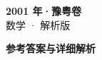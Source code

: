 \documentclass[zihao=-4, a4paper]{ctexart}
\begin{document}
\begin{center}
  {\Large\bfseries 2001 年·豫粤卷}\\[4pt]
  {\large 数学 · 解析版}
\end{center}
\medskip
{}

\clearpage
{}
\begin{center}{\Large\bfseries 参考答案与详细解析}\end{center}
\medskip

\end{document}
